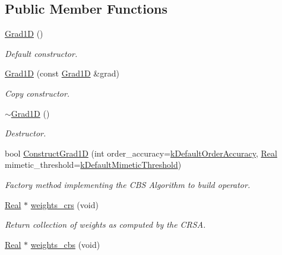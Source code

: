 \subsection*{Public Member Functions}
\begin{DoxyCompactItemize}
\item 
\hyperlink{classmtk_1_1Grad1D_ae21e6ac2652e653c48f15b304ee83a75}{Grad1\-D} ()
\begin{DoxyCompactList}\small\item\em Default constructor. \end{DoxyCompactList}\item 
\hyperlink{classmtk_1_1Grad1D_a5708bcb61bde3f7f3a4ddede191d82a4}{Grad1\-D} (const \hyperlink{classmtk_1_1Grad1D}{Grad1\-D} \&grad)
\begin{DoxyCompactList}\small\item\em Copy constructor. \end{DoxyCompactList}\item 
\hyperlink{classmtk_1_1Grad1D_a2f9b1d306c0f09f36145bb1e7e486b54}{$\sim$\-Grad1\-D} ()
\begin{DoxyCompactList}\small\item\em Destructor. \end{DoxyCompactList}\item 
bool \hyperlink{classmtk_1_1Grad1D_a74ef5245cfae6fd158bd7f563a0c2e52}{Construct\-Grad1\-D} (int order\-\_\-accuracy=\hyperlink{group__c01-roots_ga0d95560098eb36420511103637b6952f}{k\-Default\-Order\-Accuracy}, \hyperlink{group__c01-roots_gac080bbbf5cbb5502c9f00405f894857d}{Real} mimetic\-\_\-threshold=\hyperlink{group__c01-roots_ga35718d949bdc81a08a9cc8ebbe3478a2}{k\-Default\-Mimetic\-Threshold})
\begin{DoxyCompactList}\small\item\em Factory method implementing the C\-B\-S Algorithm to build operator. \end{DoxyCompactList}\item 
\hyperlink{group__c01-roots_gac080bbbf5cbb5502c9f00405f894857d}{Real} $\ast$ \hyperlink{classmtk_1_1Grad1D_a50ea44bda43d32b8741e050af52b961d}{weights\-\_\-crs} (void)
\begin{DoxyCompactList}\small\item\em Return collection of weights as computed by the C\-R\-S\-A. \end{DoxyCompactList}\item 
\hyperlink{group__c01-roots_gac080bbbf5cbb5502c9f00405f894857d}{Real} $\ast$ \hyperlink{classmtk_1_1Grad1D_adde70cb7e4fd930f84121a4bcd7f2e37}{weights\-\_\-cbs} (void)

\end{DoxyCompactItemize}
